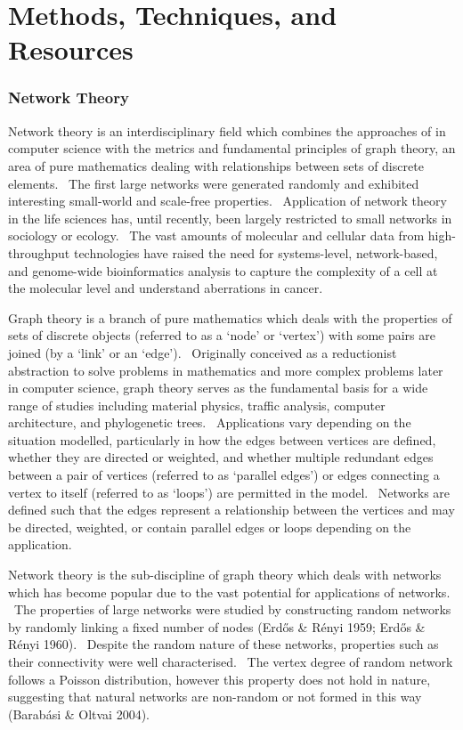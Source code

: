 \chapter{Methods, Techniques, and Resources}
\label{chap:methods}

\subsection{Network Theory}

Network theory is an interdisciplinary field which combines the approaches of in computer science with the metrics and fundamental principles of graph theory, an area of pure mathematics dealing with relationships between sets of discrete elements. \ The first large networks were generated randomly and exhibited interesting small-world and scale-free properties. \ Application of network theory in the life sciences has, until recently, been largely restricted to small networks in sociology or ecology. \ The vast amounts of molecular and cellular data from high-throughput technologies have raised the need for systems-level, network-based, and genome-wide bioinformatics analysis to capture the complexity of a cell at the molecular level and understand aberrations in cancer. 

Graph theory is a branch of pure mathematics which deals with the properties of sets of discrete objects (referred to as a {\textquoteleft}node{\textquoteright} or {\textquoteleft}vertex{\textquoteright}) with some pairs are joined (by a {\textquoteleft}link{\textquoteright} or an {\textquoteleft}edge{\textquoteright}). \ Originally conceived as a reductionist abstraction to solve problems in mathematics and more complex problems later in computer science, graph theory serves as the fundamental basis for a wide range of studies including material physics, traffic analysis, computer architecture, and phylogenetic trees. \ Applications vary depending on the situation modelled, particularly in how the edges between vertices are defined, whether they are directed or weighted, and whether multiple redundant edges between a pair of vertices (referred to as {\textquoteleft}parallel edges{\textquoteright}) or edges connecting a vertex to itself (referred to as {\textquoteleft}loops{\textquoteright}) are permitted in the model. \ Networks are defined such that the edges represent a relationship between the vertices and may be directed, weighted, or contain parallel edges or loops depending on the application. \ 

Network theory is the sub-discipline of graph theory which deals with networks which has become popular due to the vast potential for applications of networks. \ The properties of large networks were studied by constructing random networks by randomly linking a fixed number of nodes (Erd\H{o}s \& R\'enyi 1959; Erd\H{o}s \& R\'enyi 1960). \ Despite the random nature of these networks, properties such as their connectivity were well characterised. \ The vertex degree of random network follows a Poisson distribution, however this property does not hold in nature, suggesting that natural networks are non-random or not formed in this way (Barab\'asi \& Oltvai 2004). \ 


